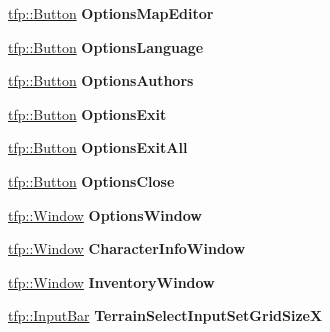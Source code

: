 \begin{DoxyCompactItemize}
\mbox{\hyperlink{classtfp_1_1_button}{tfp\+::\+Button}} {\bfseries Options\+Map\+Editor}
\item 
\mbox{\label{classtfp_1_1_interface_ad7f38639354ee643f4add54936df7ac9}} 
\mbox{\hyperlink{classtfp_1_1_button}{tfp\+::\+Button}} {\bfseries Options\+Language}
\item 
\mbox{\label{classtfp_1_1_interface_a71c4cc9b661a89804f571ec9c0192a7d}} 
\mbox{\hyperlink{classtfp_1_1_button}{tfp\+::\+Button}} {\bfseries Options\+Authors}
\item 
\mbox{\label{classtfp_1_1_interface_a367f8206a34c9aefd555751e04ca6e04}} 
\mbox{\hyperlink{classtfp_1_1_button}{tfp\+::\+Button}} {\bfseries Options\+Exit}
\item 
\mbox{\label{classtfp_1_1_interface_a71b221d394f401d625be8855d74ed7e6}} 
\mbox{\hyperlink{classtfp_1_1_button}{tfp\+::\+Button}} {\bfseries Options\+Exit\+All}
\item 
\mbox{\label{classtfp_1_1_interface_a7e2a00c4353efd778fe09e1397566df8}} 
\mbox{\hyperlink{classtfp_1_1_button}{tfp\+::\+Button}} {\bfseries Options\+Close}
\item 
\mbox{\label{classtfp_1_1_interface_ad252603f669f5173615c84046087c98c}} 
\mbox{\hyperlink{classtfp_1_1_window}{tfp\+::\+Window}} {\bfseries Options\+Window}
\item 
\mbox{\label{classtfp_1_1_interface_a9f3e4b447b38ea3bf4ad671bfc0cea9e}} 
\mbox{\hyperlink{classtfp_1_1_window}{tfp\+::\+Window}} {\bfseries Character\+Info\+Window}
\item 
\mbox{\label{classtfp_1_1_interface_aad357567f5b0659e92fed0869f18740c}} 
\mbox{\hyperlink{classtfp_1_1_window}{tfp\+::\+Window}} {\bfseries Inventory\+Window}
\item 
\mbox{\label{classtfp_1_1_interface_a759d6789c20a307709b6cf1ea72631d7}} 
\mbox{\hyperlink{classtfp_1_1_input_bar}{tfp\+::\+Input\+Bar}} {\bfseries Terrain\+Select\+Input\+Set\+Grid\+SizeX}

\end{DoxyCompactItemize}
